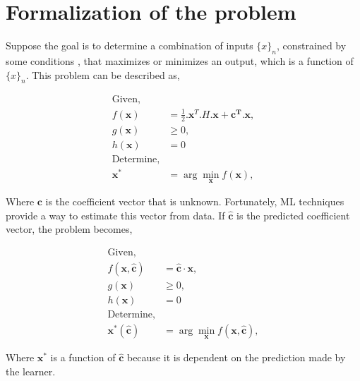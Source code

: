 \documentclass[12pt, letterpaper]{article}
\begin{document}
\section{Formalization of the problem}
\label{sec: formalization}
Suppose the goal is to determine a combination of inputs $\{x\}_n$, constrained
by some conditions , that maximizes or minimizes an output, which is a function
of $\{x\}_n$. This problem can be described as,



\begin{align}
    \text{Given,}  & \\
    f(\mathbf{x}) &= \frac{1}{2}.\mathbf{x}^T.H.\mathbf{x} + \mathbf{c^T.x}, \\
    g(\mathbf{x}) &\geq 0, \\
    h(\mathbf{x}) &= 0 \\
    \text{Determine,} & \\
    \mathbf{x}^* &= \arg \min_{\mathbf{x}} f(\mathbf{x}),
\end{align}

Where $\mathbf{c}$ is the coefficient vector that is unknown. Fortunately, ML
techniques provide a way to estimate this vector from data. If
$\hat{\mathbf{c}}$ is the predicted coefficient vector, the problem becomes,

\begin{align}
    \text{Given,}  & \\
    f(\mathbf{x}, \hat{\mathbf{c}}) &= \hat{\mathbf{c}} \cdot \mathbf{x}, \\
    g(\mathbf{x}) &\geq 0, \\
    h(\mathbf{x}) &= 0 \\
    \text{Determine,} & \\
    \mathbf{x}^*(\hat{\mathbf{c}}) &= \arg \min_{\mathbf{x}} f(\mathbf{x}, \hat{\mathbf{c}}),
\end{align}

Where $\mathbf{x}^*$ is a function of $\hat{\mathbf{c}}$ because it is dependent
on the prediction made by the learner. 
\end{document}
